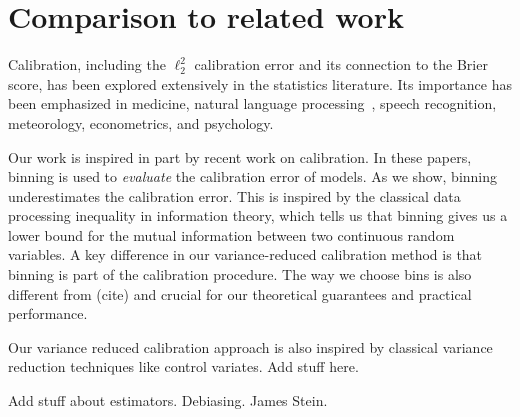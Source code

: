 \section{Comparison to related work}

Calibration, including the $\ell_2^2$ calibration error and its connection to the Brier score, has been explored extensively in the statistics literature. Its importance has been emphasized in medicine, natural language processing~\cite{jiang2012calibrating}, speech recognition, meteorology, econometrics, and psychology.

Our work is inspired in part by recent work on calibration. In these papers, binning is used to \emph{evaluate} the calibration error of models. As we show, binning underestimates the calibration error. This is inspired by the classical data processing inequality in information theory, which tells us that binning gives us a lower bound for the mutual information between two continuous random variables. A key difference in our variance-reduced calibration method is that binning is part of the calibration procedure. The way we choose bins is also different from (cite) and crucial for our theoretical guarantees and practical performance.

Our variance reduced calibration approach is also inspired by classical variance reduction techniques like control variates. Add stuff here.

Add stuff about estimators. Debiasing. James Stein.
